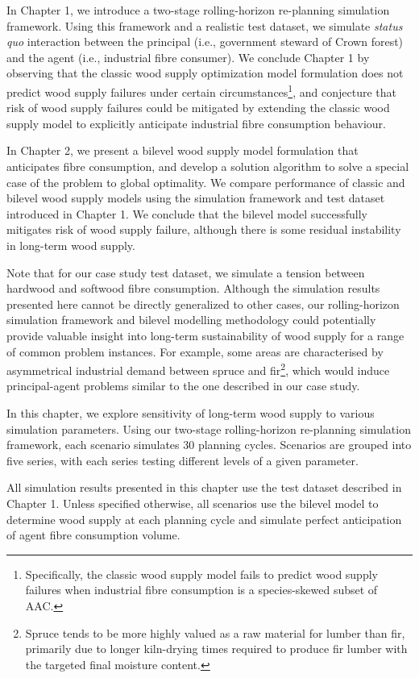 In Chapter 1, we introduce a two-stage rolling-horizon re-planning simulation framework. Using this framework and a realistic test dataset, we simulate \emph{status quo} interaction between the principal (i.e., government steward of Crown forest) and the agent (i.e., industrial fibre consumer). We conclude Chapter 1 by observing that the classic wood supply optimization model formulation does not predict wood supply failures under certain circumstances\footnote{Specifically, the classic wood supply model fails to predict wood supply failures when industrial fibre consumption is a species-skewed subset of AAC.}, and conjecture that risk of wood supply failures could be mitigated by extending the classic wood supply model to explicitly anticipate industrial fibre consumption behaviour.

In Chapter 2, we present a bilevel wood supply model formulation that anticipates fibre consumption, and develop a solution algorithm to solve a special case of the problem to global optimality. We compare performance of classic and bilevel wood supply models using the simulation framework and test dataset introduced in Chapter 1. We conclude that the bilevel model successfully mitigates risk of wood supply failure, although there is some residual instability in long-term wood supply. 

Note that for our case study test dataset, we simulate a tension between hardwood and softwood fibre consumption. Although the simulation results presented here cannot be directly generalized to other cases, our rolling-horizon simulation framework and bilevel modelling methodology could potentially provide valuable insight into long-term sustainability of wood supply for a range of common problem instances. For example, some areas are characterised by asymmetrical industrial demand between spruce and fir\footnote{Spruce tends to be more highly valued as a raw material for lumber than fir, primarily due to longer kiln-drying times required to produce fir lumber with the targeted final moisture content.}, which would induce principal-agent problems similar to the one described in our case study.

In this chapter, we explore sensitivity of long-term wood supply to various simulation parameters. Using our two-stage rolling-horizon re-planning simulation framework, each scenario simulates 30 planning cycles. Scenarios are grouped into five series, with each series testing different levels of a given parameter. 

All simulation results presented in this chapter use the test dataset described in Chapter 1. Unless specified otherwise, all scenarios use the bilevel model to determine wood supply at each planning cycle and simulate perfect anticipation of agent fibre consumption volume. 

